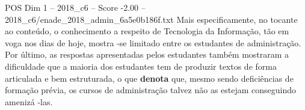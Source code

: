 \begin{textsample}{POS Dim 1 – 2018\_c6 – Score -2.00 – 2018\_c6/enade\_2018\_admin\_6a5e0b186f.txt}
Mais especificamente, no tocante ao conteúdo, o conhecimento a respeito de Tecnologia da Informação, tão em voga nos dias de hoje, mostra -se limitado entre os estudantes de administração.
Por último, as respostas apresentadas pelos estudantes também mostraram a dificuldade que a maioria dos estudantes tem de produzir textos de forma articulada e bem estruturada, o que \textbf{denota} que, mesmo sendo deficiências de formação prévia, os cursos de administração talvez não as estejam conseguindo amenizá -las.

\end{textsample}
